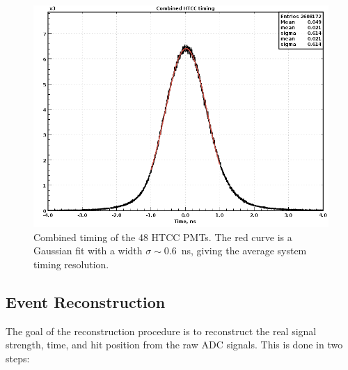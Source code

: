\begin{figure}[ht]
\centering
\includegraphics[width=0.95\linewidth]{images/deltaTime6.png}
\caption{Combined timing of the 48 HTCC PMTs. The red curve is a Gaussian fit with a width $\sigma \sim$0.6~ns,
  giving the average system timing resolution.}
\label{fig:htcccombinedTimingResponce}
\end{figure}

\subsection{Event Reconstruction}

The goal of the reconstruction procedure is to reconstruct the real signal strength, time, and hit position from the
raw ADC signals. This is done in two steps:

